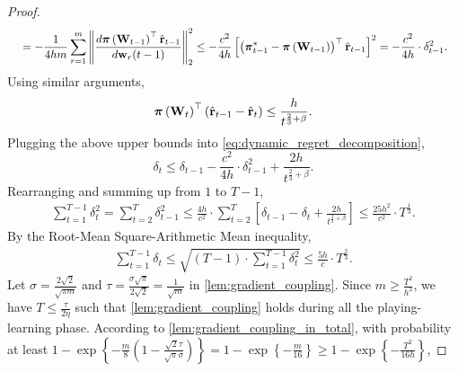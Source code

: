 \begin{proof}
\begin{equation*}
\begin{split}
    &\quad = - \frac{1}{4 h m} \sum\limits_{r=1}^{m}{ \left\| \frac{d {\boldsymbol{\pi}}\left( {\mathbf{W}}_{t-1} \right)^\top \hat{{\mathbf{r}}}_{t-1}}{d {\mathbf{w}}_r(t-1)} \right\|_2^2 } \le - \frac{c^2}{4 h} \left[ \left( {{\boldsymbol{\pi}}_{t-1}^*} - {\boldsymbol{\pi}}\left( {\mathbf{W}}_{t-1} \right) \right)^\top \hat{{\mathbf{r}}}_{t-1}  \right]^2 = - \frac{c^2}{4 h} \cdot \delta_{t-1}^2.
\end{split}
\end{equation*}
Using similar arguments,
\begin{equation*}
    {\boldsymbol{\pi}}\left( {\mathbf{W}}_t \right)^\top \left( \hat{{\mathbf{r}}}_{t-1} - \hat{{\mathbf{r}}}_t  \right) \le \frac{ h }{t^{\frac{2}{3} + \beta}}.
\end{equation*}
Plugging the above upper bounds into \cref{eq:dynamic_regret_decomposition},
\begin{equation*}
    \delta_t \le \delta_{t-1} - \frac{c^2}{4 h} \cdot \delta_{t-1}^2 + \frac{ 2 h }{t^{\frac{2}{3} + \beta}}.
\end{equation*}
Rearranging and summing up from $1$ to $T-1$,
\begin{equation*}
\begin{split}
    \sum\limits_{t=1}^{T-1}{\delta_{t}^2} = \sum\limits_{t=2}^{T}{\delta_{t-1}^2} \le \frac{4 h}{ c^2} \cdot  \sum\limits_{t=2}^{T} { \left[ \delta_{t-1} - \delta_t + \frac{ 2 h }{t^{\frac{2}{3} + \beta}} \right] } \le \frac{25 h^2}{ c^2} \cdot T^{\frac{1}{3}}.
\end{split}
\end{equation*}
By the Root-Mean Square-Arithmetic Mean inequality,
\begin{equation*}
\begin{split}
    \sum\limits_{t=1}^{T-1}{\delta_{t}} \le \sqrt{\left(T  - 1 \right) \cdot \sum\limits_{t=1}^{T-1}{\delta_{t}^2}} \le \frac{5 h}{c} \cdot  T^{\frac{2}{3}}.
\end{split}
\end{equation*}
Let $\sigma = \frac{2 \sqrt{2}}{\sqrt{\pi m}}$ and $\tau = \frac{\sigma \sqrt{\pi}}{2 \sqrt{2}} = \frac{1}{\sqrt{m}}$ in \cref{lem:gradient_coupling}. Since $m \ge \frac{T^2}{h^2}$, we have $T \le \frac{\tau}{2 \eta}$ such that \cref{lem:gradient_coupling} holds during all the playing-learning phase. According to \cref{lem:gradient_coupling_in_total}, with probability at least $1 - \exp\left\{ - \frac{m}{8} \left( 1 - \frac{\sqrt{2}\tau}{\sqrt{\pi}\sigma} \right) \right\} = 1 - \exp\left\{ - \frac{m}{16} \right\} \ge 1 - \exp\left\{ - \frac{T^2}{16 h} \right\}$,
\end{proof}



